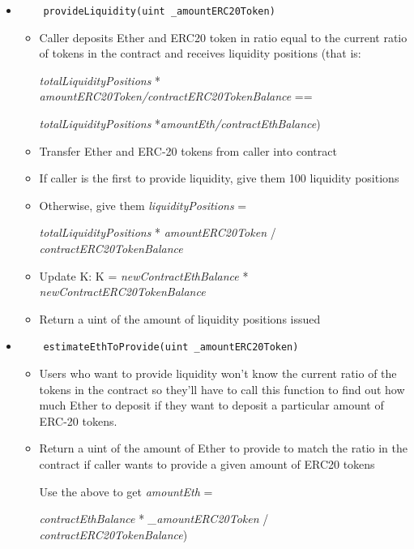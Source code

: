 \documentclass[10pt]{article}
\begin{document}
\begin{itemize}
    \item 
\begin{verbatim}
    provideLiquidity(uint _amountERC20Token)
\end{verbatim}
\begin{itemize}
    \item Caller deposits Ether and ERC20 token in ratio equal to the current ratio of tokens in the contract and receives liquidity positions  (that is: 
    
    {\it totalLiquidityPositions} * {\it amountERC20Token/contractERC20TokenBalance} ==
    
     {\it totalLiquidityPositions}  *{\it amountEth/contractEthBalance})
         \item Transfer Ether and ERC-20 tokens from caller into contract
    \item If caller is the first to provide liquidity, give them 100 liquidity positions
    \item Otherwise, give them {\it liquidityPositions} = 
    
    {\it totalLiquidityPositions} * {\it amountERC20Token} / {\it contractERC20TokenBalance}
    \item Update K: K = {\it newContractEthBalance} * {\it newContractERC20TokenBalance}
    \item Return a uint of the amount of liquidity positions issued
\end{itemize}

\item
\begin{verbatim}
    estimateEthToProvide(uint _amountERC20Token)
\end{verbatim}
\begin{itemize}
    \item Users who want to provide liquidity won’t know the current ratio of the tokens in the contract so they’ll have to call this function to find out how much Ether to deposit if they want to deposit a particular amount of ERC-20 tokens.
    \item Return a uint of the amount of Ether to provide to match the ratio in the contract if caller wants to provide a given amount of ERC20 tokens 
        
   Use the above to get {\it amountEth} = 
    
    {\it contractEthBalance} *  {\it \_amountERC20Token} / {\it contractERC20TokenBalance})
\end{itemize}


\end{itemize}
\end{document}
